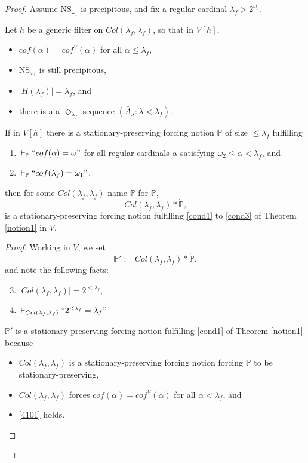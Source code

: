 \documentclass[12pt]{article}
\numberwithin{equation}{section}
\begin{document}
\begin{proof}
Assume $\mathrm{NS}_{\omega_1}$ is precipitous, and fix a regular cardinal $\lambda_f > 2^{\omega_1}$.  

Let $h$ be a generic filter on $Col(\lambda_f, \lambda_f)$, so that in $V[h]$, 
\begin{itemize}
    \item $cof(\alpha) = cof^{V}(\alpha)$ for all $ \alpha \leq \lambda_f$,
    \item $\mathrm{NS}_{\omega_1}$ is still precipitous,
    \item $|H(\lambda_f)| = \lambda_f$, and
    \item there is a a $\Diamond_{\lambda_f}$-sequence $(\bar{A}_{\lambda} : \lambda < \lambda_f)$.
\end{itemize}

\begin{lem}\label{lem26}
If in $V[h]$ there is a stationary-preserving forcing notion $\mathbb{P}$ of size $\leq \lambda_f$ fulfilling 
\begin{enumerate}[label=(\arabic*')]
    \item\label{4101} $\Vdash_{\mathbb{P}} ``cof(\alpha) = \omega"$ for all regular cardinals $\alpha$ satisfying $\omega_2 \leq \alpha < \lambda_f$, and
    \item\label{4102} $\Vdash_{\mathbb{P}} ``cof(\lambda_f) = \omega_1"$,
\end{enumerate}
then for some $Col(\lambda_f, \lambda_f)$-name $\dot{\mathbb{P}}$ for $\mathbb{P}$,
\begin{equation*}
    Col(\lambda_f, \lambda_f) * \dot{\mathbb{P}} \text{,}
\end{equation*} 
is a stationary-preserving forcing notion fulfilling \ref{cond1} to \ref{cond3} of Theorem \ref{notion1} in $V$.
\end{lem}

\begin{proof}
Working in $V$, we set $$\mathbb{P}' := Col(\lambda_f, \lambda_f) * \dot{\mathbb{P}} \text{,}$$ and note the following facts:
\begin{enumerate}[label=(\arabic*')]
    \setcounter{enumi}{2}
    \item\label{4103} $|Col(\lambda_f, \lambda_f)| = 2^{< \lambda_f}$,
    \item\label{4104} $\Vdash_{Col(\lambda_f, \lambda_f)} ``2^{< \lambda_f} = \lambda_f"$
\end{enumerate}
$\mathbb{P}'$ is a stationary-preserving forcing notion fulfilling \ref{cond1} of Theorem \ref{notion1} because 
\begin{itemize}
    \item $Col(\lambda_f, \lambda_f)$ is a stationary-preserving forcing notion forcing $\dot{\mathbb{P}}$ to be stationary-preserving, 
    \item $Col(\lambda_f, \lambda_f)$ forces $cof(\alpha) = cof^{V}(\alpha)$ for all $ \alpha < \lambda_f$, and
    \item \ref{4101} holds.
\end{itemize}


\end{proof}
\end{proof}
\end{document}
